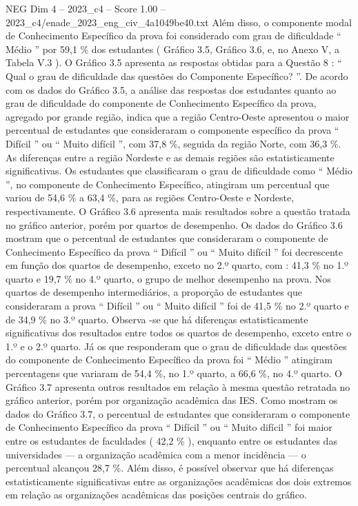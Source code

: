 \begin{textsample}{NEG Dim 4 – 2023\_c4 – Score 1.00 – 2023\_c4/enade\_2023\_eng\_civ\_4a1049be40.txt}
Além disso, o componente modal de Conhecimento Específico da prova foi considerado com grau de dificuldade “ Médio ” por 59,1 \% dos estudantes ( Gráfico 3.5, Gráfico 3.6, e, no Anexo V, a Tabela V.3 ).
O Gráfico 3.5 apresenta as respostas obtidas para a Questão 8 : “ Qual o grau de dificuldade das questões do Componente Específico? ”.
De acordo com os dados do Gráfico 3.5, a análise das respostas dos estudantes quanto ao grau de dificuldade do componente de Conhecimento Específico da prova, agregado por grande região, indica que a região Centro-Oeste apresentou o maior percentual de estudantes que consideraram o componente específico da prova “ Difícil ” ou “ Muito difícil ”, com 37,8 \%, seguida da região Norte, com 36,3 \%.
As diferenças entre a região Nordeste e as demais regiões são estatisticamente significativas.
Os estudantes que classificaram o grau de dificuldade como “ Médio ”, no componente de Conhecimento Específico, atingiram um percentual que variou de 54,6 \% a 63,4 \%, para as regiões Centro-Oeste e Nordeste, respectivamente.
O Gráfico 3.6 apresenta mais resultados sobre a questão tratada no gráfico anterior, porém por quartos de desempenho.
Os dados do Gráfico 3.6 mostram que o percentual de estudantes que consideraram o componente de Conhecimento Específico da prova “ Difícil ” ou “ Muito difícil ” foi decrescente em função dos quartos de desempenho, exceto no 2.º quarto, com : 41,3 \% no 1.º quarto e 19,7 \% no 4.º quarto, o grupo de melhor desempenho na prova.
Nos quartos de desempenho intermediários, a proporção de estudantes que consideraram a prova “ Difícil ” ou “ Muito difícil ” foi de 41,5 \% no 2.º quarto e de 34,9 \% no 3.º quarto.
Observa -se que há diferenças estatisticamente significativas dos resultados entre todos os quartos de desempenho, exceto entre o 1.º e o 2.º quarto.
Já os que responderam que o grau de dificuldade das questões do componente de Conhecimento Específico da prova foi “ Médio ” atingiram percentagens que variaram de 54,4 \%, no 1.º quarto, a 66,6 \%, no 4.º quarto.
O Gráfico 3.7 apresenta outros resultados em relação à mesma questão retratada no gráfico anterior, porém por organização acadêmica das IES.
Como mostram os dados do Gráfico 3.7, o percentual de estudantes que consideraram o componente de Conhecimento Específico da prova “ Difícil ” ou “ Muito difícil ” foi maior entre os estudantes de faculdades ( 42,2 \% ), enquanto entre os estudantes das universidades — a organização acadêmica com a menor incidência — o percentual alcançou 28,7 \%.
Além disso, é possível observar que há diferenças estatisticamente significativas entre as organizações acadêmicas dos dois extremos em relação as organizações acadêmicas das posições centrais do gráfico.

\end{textsample}
